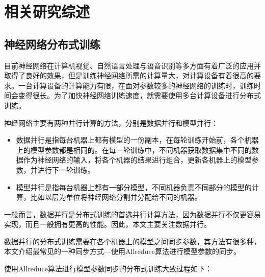 \chapter{相关研究综述}
\label{chap2}

\section{神经网络分布式训练}
目前神经网络在计算机视觉、自然语言处理与语音识别等多方面有着广泛的应用并取得了良好的效果，但是训练神经网络所需的计算量大，对计算设备有着很高的要求。一台计算设备的计算能力有限，在面对参数较多的神经网络的训练时，训练时间会变得很长。为了加快神经网络训练速度，就需要使用多台计算设备进行分布式训练。

神经网络主要有两种并行计算的方法，分别是数据并行和模型并行：
\begin{itemize}
    \item 数据并行是指每台机器上都有模型的一份副本，在每轮训练开始前，各个机器上的模型参数都是相同的。在每一轮训练中，不同机器获取数据集中不同的数据作为神经网络的输入，将各个机器的结果进行组合，更新各机器上的模型参数，并进行下一轮训练。
    \item 模型并行是指每台机器上都有一部分模型，不同机器负责不同部分的模型的计算，比如以层为单位将神经网络分割并分配给不同的机器。
\end{itemize}

一般而言，数据并行是分布式训练的首选并行计算方法，因为数据并行不仅更容易实现，而且一般拥有更高的性能。因此，本文主要关注数据并行。

数据并行的分布式训练需要在各个机器上的模型之间同步参数，其方法有很多种，本文介绍最常见的一种同步方式---使用Allreduce算法进行模型参数的同步。

使用Allreduce算法进行模型参数同步的分布式训练大致过程如下：

